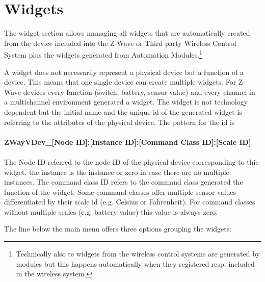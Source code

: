 \section{Widgets}

The widget section allows managing all widgets that are automatically created from the 
device included into the Z-Wave or Third party Wireless Control System plus the widgets
generated from Automation Modules.\footnote{Technically also te widgets from the wireless 
control systems are generated by modules but this happens automatically when they registered
resp. included in the wireless system.}

A widget does not necessarily represent a physical device but a function of a device.
This means that one single device can create multiple widgets.
For Z-Wave devices every function (switch, battery, sensor value) and every channel in 
a multichannel environment generated a widget. The widget is not technology dependent but 
the initial name and the unique id of the generated widget is referring to the attributes 
of the physical  device. The pattern for the id is

\paragraph{ZWayVDev\_[Node ID]:[Instance ID]:[Command Class ID]:[Scale ID]}

\paragraph{}

The Node ID referred to the node ID of the physical device corresponding to thie widget, 
the instance is the instance or zero in case there are no multiple instances.
The command class ID refers to the command class generated the function of the widget.
Some command classes offer multiple sensor values differentiated by their scale id (e.g. 
Celsius or Fahrenheit). For command classes without multiple scales (e.g. battery value) 
this value is always zero.

The line below the main menu offers three options grouping the widgets:

